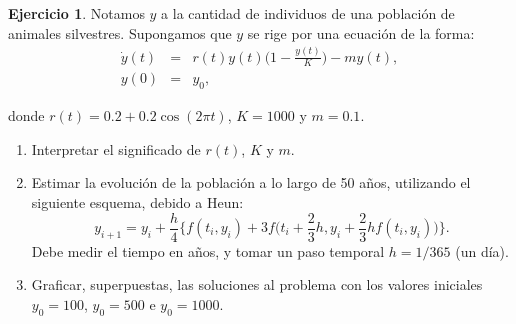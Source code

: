 \documentclass[12pt, a4paper]{amsbook}
\theoremstyle{remark}
\theoremstyle{definition}
\newtheorem{ejer}[teo]{Ejercicio}
\numberwithin{section}{chapter}
\numberwithin{subsection}{section}
\numberwithin{equation}{section}
\numberwithin{figure}{chapter}
\begin{document}
\begin{ejer} Notamos $y$ a la cantidad de individuos de una población de animales silvestres. Supongamos que $y$ se rige por una ecuación de la forma:
$$ \begin{array}{rcl} \dot{y}(t) &=& r(t)y(t)\Big(1-\frac{y(t)}{K}\Big)-m y(t),\\
            y(0) &=& y_0, \end{array}$$

donde $r(t) = 0.2+0.2 \cos(2\pi t)$, $K=1000$ y $m=0.1$.

\begin{enumerate}
\item Interpretar el significado de $r(t)$, $K$ y $m$. 
\item Estimar la evolución de la población a lo largo de 50 años, utilizando el siguiente esquema, debido a Heun: 
$$y_{i+1} = y_i + \frac{h}{4}\Big\{f(t_i,y_i)+3f\Big(t_i+\frac{2}{3}h,y_i+\frac{2}{3}hf(t_i,y_i)\Big)\Big\}.$$
Debe medir el tiempo en años, y tomar un paso temporal $h=1/365$ (un día).
\item Graficar, superpuestas, las soluciones al problema con los valores iniciales $y_0=100$, $y_0 = 500$ e $y_0 = 1000$.  
\end{enumerate} 
\end{ejer}
\end{document}
